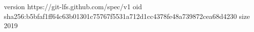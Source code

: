 version https://git-lfs.github.com/spec/v1
oid sha256:b5bfaf1ff64c63b01301c75767f5531a712d1cc4378fe48a739872cea68d4230
size 2019
